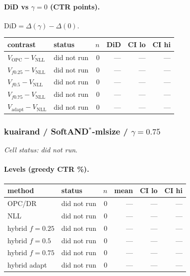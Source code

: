 \documentclass[10pt,a4paper]{article}
\begin{document}
\paragraph{DiD vs $\gamma=0$ (CTR points).} $\mathrm{DiD}=\Delta(\gamma)-\Delta(0)$.
{\centering\small\begin{tabular}{llrrrr}
\toprule contrast & status & $n$ & DiD & CI lo & CI hi \\
\midrule
$V_{\mathrm{OPC}}-V_{\mathrm{NLL}}$ & did not run & 0 & --- & --- & --- \\
$V_{f0.25}-V_{\mathrm{NLL}}$ & did not run & 0 & --- & --- & --- \\
$V_{f0.5}-V_{\mathrm{NLL}}$ & did not run & 0 & --- & --- & --- \\
$V_{f0.75}-V_{\mathrm{NLL}}$ & did not run & 0 & --- & --- & --- \\
$V_{\mathrm{adapt}}-V_{\mathrm{NLL}}$ & did not run & 0 & --- & --- & --- \\
\bottomrule\end{tabular}\par}
\bigskip
\subsubsection{kuairand / SoftAND$^*$-mlsize / $\gamma=0.75$}
\emph{Cell status: did not run}.
\paragraph{Levels (greedy CTR \%).}
{\centering\small\begin{tabular}{llrrrr}
\toprule method & status & $n$ & mean & CI lo & CI hi \\
\midrule
OPC/DR & did not run & 0 & --- & --- & --- \\
NLL & did not run & 0 & --- & --- & --- \\
hybrid $f{=}0.25$ & did not run & 0 & --- & --- & --- \\
hybrid $f{=}0.5$ & did not run & 0 & --- & --- & --- \\
hybrid $f{=}0.75$ & did not run & 0 & --- & --- & --- \\
hybrid adapt & did not run & 0 & --- & --- & --- \\
\bottomrule\end{tabular}\par}
\end{document}
